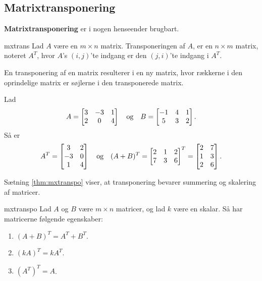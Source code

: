 \subsection{Matrixtransponering}
%
\textbf{Matrixtransponering} er i nogen henseender brugbart. 
%
%
%
\begin{defn}{}{mxtrans}
Lad $A$ være en $m \times n$ matrix. Transponeringen af $A$, er en $n \times m$ matrix, noteret $A^T$, hvor $A$'s $(i,j)$'te indgang er den $(j,i)$'te indgang i $A^T$.
\end{defn}
\noindent
%
En transponering af en matrix resulterer i en ny matrix, hvor rækkerne i den oprindelige matrix er søjlerne i den transponerede matrix.
\\
%
\begin{eks}
\label{eks:trans}
%
Lad 
%
\begin{align*}
A= 
\begin{bmatrix}
3	&	-3	&	1 \\
2	&	0	&	4
\end{bmatrix}
\text{\phantom{---}og\phantom{---}}
B= 
\begin{bmatrix}
-1	&	4	&	1\\
5	&	3	&	2
\end{bmatrix}.
\end{align*}
%
Så er
%
\begin{align*}
A^T =
\begin{bmatrix}
3	&	2\\
-3	&	0\\
1	&	4
\end{bmatrix}
\text{\phantom{---}og\phantom{---}}
(A+B)^T=
\begin{bmatrix}
2	&	1	&	2\\
7	&	3	&	6
\end{bmatrix}^T
=
\begin{bmatrix}
2	&	7\\
1	&	3\\
2	&	6
\end{bmatrix}.
\end{align*}
%
\end{eks}
%
%
Sætning \ref{thm:mxtranspo} viser, at transponering bevarer summering og skalering af matricer.
%
\begin{thm}{}{mxtranspo}
Lad $A$ og $B$ være $m \times n$ matricer, og lad $k$ være en skalar.
Så har matricerne følgende egenskaber:
\begin{enumerate}[label=(\alph*)]
\item $(A + B)^T = A^T + B^T$.
\item $(kA)^T = kA^T$.
\item $(A^T)^T = A$.
\end{enumerate}
\end{thm}
